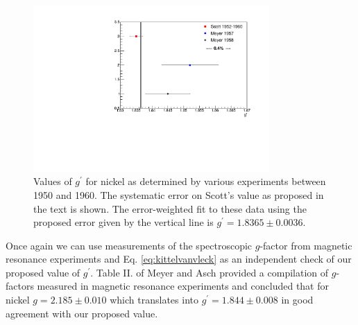 \documentclass[preprint,12pt]{elsarticle}
\begin{document}
\begin{figure}[h]
\centering
\includegraphics[width=0.8\textwidth]{gprime_world_data_Ni.pdf}
\caption{Values of $g^{\prime}$ for nickel as determined by various experiments between 1950 and 1960. The systematic error on Scott's value as proposed in the text is shown. The error-weighted fit to these data using the proposed error given by the vertical line is $g^{\prime}=1.8365\pm0.0036$.}
\label{fig:gprime_world_data_Ni}
\end{figure}

Once again we can use measurements of the spectroscopic $g$-factor from magnetic resonance experiments and Eq. \ref{eq:kittelvanvleck} as an independent check of our proposed value of $g^{\prime}$. Table II. of Meyer and Asch \cite{Meyer1961} provided a compilation of $g$-factors measured in magnetic resonance experiments and concluded that for nickel $g=2.185\pm0.010$ which translates into $g^{\prime}=1.844\pm0.008$ in good agreement with our proposed value.
\end{document}
